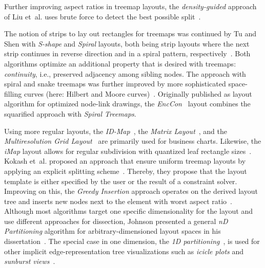 \documentclass[sigconf%
,natbib=true%
]{acmart}
\begin{document}
Further improving aspect ratios in treemap layouts, the \emph{density-guided} approach of Liu et~al. uses brute force to detect the best possible split~\cite{liu2008-nsffunding}.
\par
The notion of strips to lay out rectangles for treemaps was continued by Tu and Shen with \emph{S-shape} and \emph{Spiral} layouts, both being strip layouts where the next strip continues in reverse direction and in a spiral pattern, respectively~\cite{tu2007-changes}.
Both algorithms optimize an additional property that is desired with treemaps: \emph{continuity}, i.e., preserved adjacency among sibling nodes.
The approach with spiral and snake treemaps was further improved by more sophisticated space-filling curves (here: Hilbert and Moore curves)~\cite{tak2013-hilbertmoore}.
Originally published as layout algorithm for optimized node-link drawings, the \emph{EncCon}~\cite{nguyen2005-enccon} layout combines the squarified approach with \emph{Spiral Treemaps}.
\par
Using more regular layouts, the \emph{ID-Map}~\cite{hao2005-importancedriven}, the \emph{Matrix Layout}~\cite{vliegen2006-businessdata}, and the \emph{Multiresolution Grid Layout}~\cite{hao2007-multiresolution} are primarily used for business charts.
Likewise, the \emph{iMap} layout allows for regular subdivision with quantized leaf rectangle sizes~\cite{wang2013-imap}.
Kokash et~al. proposed an approach that ensure uniform treemap layouts by applying an explicit splitting scheme~\cite{kokash2014-templatebased}.
Thereby, they propose that the layout template is either specified by the user or the result of a constraint solver.
Improving on this, the \emph{Greedy Insertion} approach operates on the derived layout tree and inserts new nodes next to the element with worst aspect ratio~\cite{vernier2018-insertion}.
Although most algorithms target one specific dimensionality for the layout and use different approaches for dissection, Johnson presented a general \emph{nD Partitioning} algorithm for arbitrary-dimensioned layout spaces in his dissertation~\cite{johnson1993-categorical}.
The special case in one dimension, the \emph{1D partitioning}~\cite{johnson1993-categorical}, is used for other implicit edge-representation tree visualizations such as \emph{icicle plots} and \emph{sunburst views}~\cite{schulz2011-implicit}.
\end{document}
